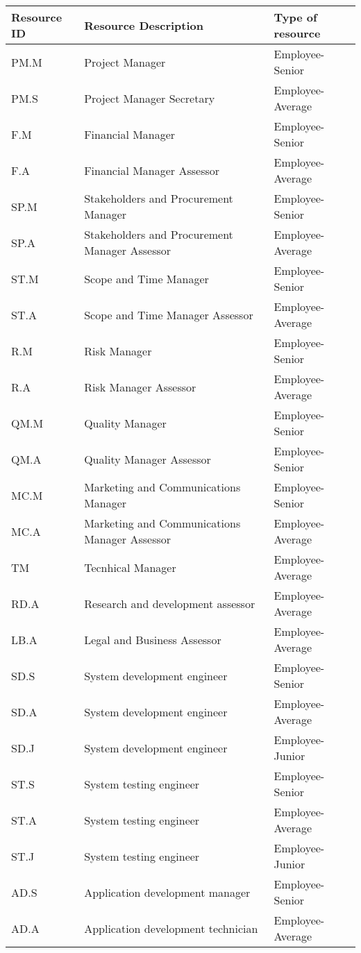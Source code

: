 \begin{longtable}{lll}
	
\toprule[2pt]

\textbf{Resource ID} & \textbf{Resource Description} & \textbf{Type of resource}  
		\\ \midrule[1.5pt] 
	
PM.M&Project Manager&Employee-Senior\\
PM.S&Project Manager Secretary&Employee-Average\\
F.M&Financial Manager&Employee-Senior\\
F.A&Financial Manager Assessor&Employee-Average\\
SP.M&Stakeholders and Procurement Manager&Employee-Senior\\
SP.A&Stakeholders and Procurement Manager Assessor&Employee-Average\\
ST.M&Scope and Time Manager&Employee-Senior\\
ST.A&Scope and Time Manager Assessor&Employee-Average\\
R.M&Risk Manager&Employee-Senior\\
R.A&Risk Manager Assessor&Employee-Average\\
QM.M&Quality Manager&Employee-Senior\\
QM.A&Quality Manager Assessor&Employee-Senior\\
MC.M&Marketing and Communications Manager&Employee-Senior\\
MC.A&Marketing and Communications Manager Assessor&Employee-Average\\
TM&Tecnhical Manager&Employee-Average\\
RD.A&Research and development assessor&Employee-Average\\
LB.A&Legal and Business Assessor&Employee-Average\\
SD.S&System development engineer&Employee-Senior\\
SD.A&System development engineer&Employee-Average\\
SD.J&System development engineer&Employee-Junior\\
ST.S&System testing engineer&Employee-Senior\\
ST.A&System testing engineer&Employee-Average\\
ST.J&System testing engineer&Employee-Junior\\
AD.S&Application development manager&Employee-Senior\\
AD.A&Application development technician&Employee-Average\\

\end{longtable}
